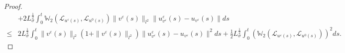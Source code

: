 \documentclass[11pt]{article}
\numberwithin{equation}{section}
\theoremstyle{plain}
\def\leq{\leqslant}
\begin{document}
\begin{proof}
\begin{align}
        &
        +
        2
        L_{\sigma}^{\frac{1}{2}}
        \int_{0}^{t}
        \mathbb{W}_2 (\mathcal{L}_{u^\varepsilon(s)}, \mathcal{L}_{u^0(s)} )
        \| v^\varepsilon(s) \|_{l^2}
        \| u_{v^\varepsilon}^\varepsilon(s) - u_{v^\varepsilon}(s) \|
        ds
        \nonumber \\
        \leq & 2 L_{\sigma}^{\frac{1}{2}}
        \int_{0}^{t}
        \| v^\varepsilon(s) \|_{l^2}
        (1+ \| v^\varepsilon(s) \|_{l^2})
        \| u_{v^\varepsilon}^\varepsilon(s) - u_{v^\varepsilon}(s) \|^2
        ds
        +
        {\frac 12} L_{\sigma}^{\frac{1}{2}}
        \int_{0}^{t}
        \left ( \mathbb{W}_2 (\mathcal{L}_{u^\varepsilon(s)}, \mathcal{L}_{u^0(s)} )
        \right )^2  ds.
    \end{align}



\end{proof}
\end{document}
